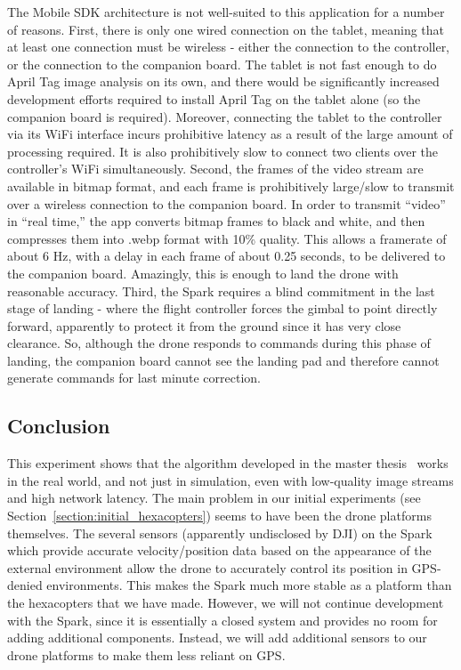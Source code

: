 The Mobile SDK architecture is not well-suited to this application for a number of reasons.
First, there is only one wired connection on the tablet, meaning that at least one connection
must be wireless - either the connection to the controller, or the connection to the companion board.
The tablet is not fast enough to do April Tag image analysis on its own,
and there would be significantly increased development efforts required to install April Tag
on the tablet alone (so the companion board is required).
Moreover, connecting the tablet to the controller via its WiFi interface incurs prohibitive latency
as a result of the large amount of processing required.
It is also prohibitively slow to connect two clients over the controller's WiFi simultaneously.
Second, the frames of the video stream are available in bitmap format,
and each frame is prohibitively large/slow to transmit over a wireless connection to the companion board.
In order to transmit ``video'' in ``real time,'' the app converts bitmap frames to black and white,
and then compresses them into .webp format with 10\% quality.
This allows a framerate of about 6 Hz, with a delay in each frame of about 0.25 seconds,
to be delivered to the companion board.
Amazingly, this is enough to land the drone with reasonable accuracy.
Third, the Spark requires a blind commitment in the last stage of landing
- where the flight controller forces the gimbal to point directly forward,
apparently to protect it from the ground since it has very close clearance.
So, although the drone responds to commands during this phase of landing,
the companion board cannot see the landing pad and therefore cannot generate commands
for last minute correction.

\subsection{Conclusion}

This experiment shows that the algorithm developed in the master thesis~\cite{joshua_master_thesis} works in the real world,
and not just in simulation, even with low-quality image streams and high network latency.
The main problem in our initial experiments (see Section~\ref{section:initial_hexacopters}) seems to have been the drone platforms themselves.
The several sensors (apparently undisclosed by DJI) on the Spark which provide accurate velocity/position data based on the appearance of the external environment
allow the drone to accurately control its position in GPS-denied environments.
This makes the Spark much more stable as a platform than the hexacopters that we have made.
However, we will not continue development with the Spark, since it is essentially a closed system and provides no
room for adding additional components.
Instead, we will add additional sensors to our drone platforms to make them less reliant on GPS.
